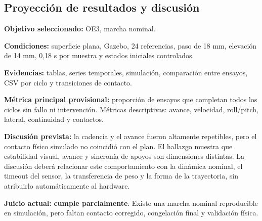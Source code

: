 \documentclass[11pt,letterpaper]{article}
\newcommand{\estado}[1]{\textbf{#1}}
\begin{document}
\subsection{Proyección de resultados y discusión}

\textbf{Objetivo seleccionado:} OE3, marcha nominal.

\textbf{Condiciones:} superficie plana, Gazebo, 24 referencias, paso de 18 mm,
elevación de 14 mm, 0,18 s por muestra y estados iniciales controlados.

\textbf{Evidencias:} tablas, series temporales, simulación, comparación entre
ensayos, CSV por ciclo y transiciones de contacto.

\textbf{Métrica principal provisional:} proporción de ensayos que completan
todos los ciclos sin fallo ni intervención. Métricas descriptivas: avance,
velocidad, roll/pitch, lateral, continuidad y contactos.

\textbf{Discusión prevista:} la cadencia y el avance fueron altamente
repetibles, pero el contacto físico simulado no coincidió con el plan. El
hallazgo muestra que estabilidad visual, avance y sincronía de apoyos son
dimensiones distintas. La discusión deberá relacionar este comportamiento con
la dinámica nominal, el timeout del sensor, la transferencia de peso y la forma
de la trayectoria, sin atribuirlo automáticamente al hardware.

\textbf{Juicio actual:} \estado{cumple parcialmente}. Existe una marcha nominal
reproducible en simulación, pero faltan contacto corregido, congelación final y
validación física.
\end{document}
